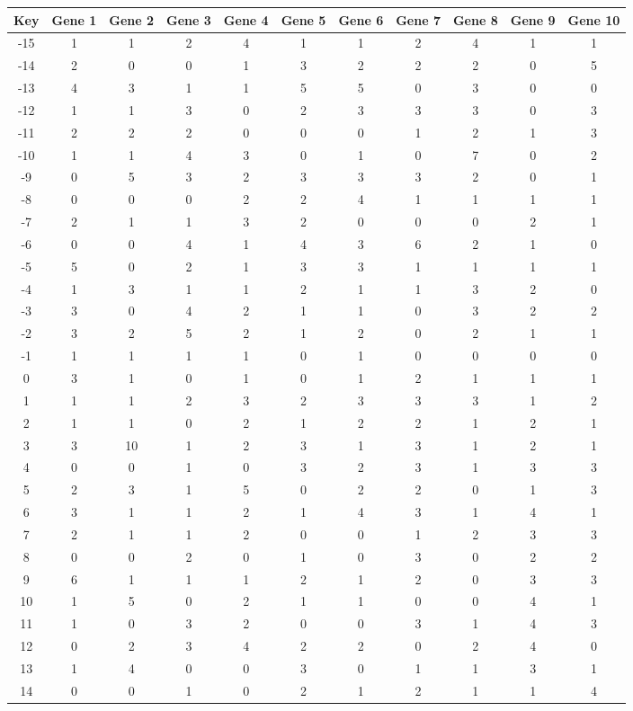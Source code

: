 \begin{tabular}{|c|c|c|c|c|c|c|c|c|c|c|}
\hline
Key & Gene 1 & Gene 2 & Gene 3 & Gene 4 & Gene 5 & Gene 6 & Gene 7 & Gene 8 & Gene 9 & Gene 10 \\
\hline
-15 & 1 & 1 & 2 & 4 & 1 & 1 & 2 & 4 & 1 & 1 \\
-14 & 2 & 0 & 0 & 1 & 3 & 2 & 2 & 2 & 0 & 5 \\
-13 & 4 & 3 & 1 & 1 & 5 & 5 & 0 & 3 & 0 & 0 \\
-12 & 1 & 1 & 3 & 0 & 2 & 3 & 3 & 3 & 0 & 3 \\
-11 & 2 & 2 & 2 & 0 & 0 & 0 & 1 & 2 & 1 & 3 \\
-10 & 1 & 1 & 4 & 3 & 0 & 1 & 0 & 7 & 0 & 2 \\
-9 & 0 & 5 & 3 & 2 & 3 & 3 & 3 & 2 & 0 & 1 \\
-8 & 0 & 0 & 0 & 2 & 2 & 4 & 1 & 1 & 1 & 1 \\
-7 & 2 & 1 & 1 & 3 & 2 & 0 & 0 & 0 & 2 & 1 \\
-6 & 0 & 0 & 4 & 1 & 4 & 3 & 6 & 2 & 1 & 0 \\
-5 & 5 & 0 & 2 & 1 & 3 & 3 & 1 & 1 & 1 & 1 \\
-4 & 1 & 3 & 1 & 1 & 2 & 1 & 1 & 3 & 2 & 0 \\
-3 & 3 & 0 & 4 & 2 & 1 & 1 & 0 & 3 & 2 & 2 \\
-2 & 3 & 2 & 5 & 2 & 1 & 2 & 0 & 2 & 1 & 1 \\
-1 & 1 & 1 & 1 & 1 & 0 & 1 & 0 & 0 & 0 & 0 \\
0 & 3 & 1 & 0 & 1 & 0 & 1 & 2 & 1 & 1 & 1 \\
1 & 1 & 1 & 2 & 3 & 2 & 3 & 3 & 3 & 1 & 2 \\
2 & 1 & 1 & 0 & 2 & 1 & 2 & 2 & 1 & 2 & 1 \\
3 & 3 & 10 & 1 & 2 & 3 & 1 & 3 & 1 & 2 & 1 \\
4 & 0 & 0 & 1 & 0 & 3 & 2 & 3 & 1 & 3 & 3 \\
5 & 2 & 3 & 1 & 5 & 0 & 2 & 2 & 0 & 1 & 3 \\
6 & 3 & 1 & 1 & 2 & 1 & 4 & 3 & 1 & 4 & 1 \\
7 & 2 & 1 & 1 & 2 & 0 & 0 & 1 & 2 & 3 & 3 \\
8 & 0 & 0 & 2 & 0 & 1 & 0 & 3 & 0 & 2 & 2 \\
9 & 6 & 1 & 1 & 1 & 2 & 1 & 2 & 0 & 3 & 3 \\
10 & 1 & 5 & 0 & 2 & 1 & 1 & 0 & 0 & 4 & 1 \\
11 & 1 & 0 & 3 & 2 & 0 & 0 & 3 & 1 & 4 & 3 \\
12 & 0 & 2 & 3 & 4 & 2 & 2 & 0 & 2 & 4 & 0 \\
13 & 1 & 4 & 0 & 0 & 3 & 0 & 1 & 1 & 3 & 1 \\
14 & 0 & 0 & 1 & 0 & 2 & 1 & 2 & 1 & 1 & 4 \\
\hline
\end{tabular}